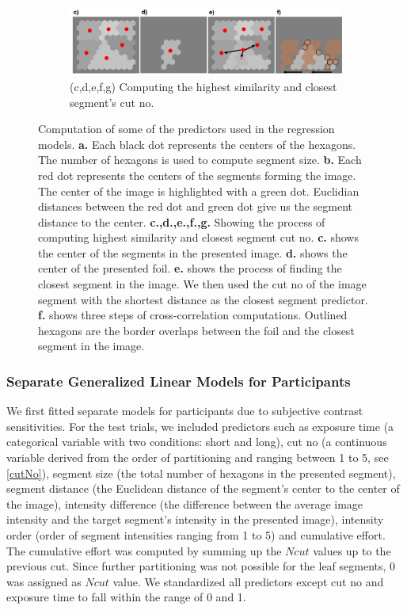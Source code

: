 \documentclass{article}
\begin{document}
\begin{figure}[!ht]
        
    \begin{subfigure}{\textwidth}          
        \centering
        \includegraphics[width = \linewidth]{plots/pred_control.png}
        \caption*{(c,d,e,f,g) Computing the highest similarity and closest segment's cut no.}
        \label{fig:pred_control}    
    \end{subfigure}    
    \label{fig:regressors}
    \caption{Computation of some of the predictors used in the regression models. \textbf{a.} Each black dot represents the centers of the hexagons. The number of hexagons is used to compute segment size. \textbf{b.} Each red dot represents the centers of the segments forming the image. The center of the image is highlighted with a green dot. Euclidian distances between the red dot and green dot give us the segment distance to the center. \textbf{c.,d.,e.,f.,g.} Showing the process of computing highest similarity and closest segment cut no. \textbf{c.} shows the center of the segments in the presented image. \textbf{d.} shows the center of the presented foil. \textbf{e.} shows the process of finding the closest segment in the image. We then used the cut no of the image segment with the shortest distance as the closest segment predictor. \textbf{f.} shows three steps of cross-correlation computations. Outlined hexagons are the border overlaps between the foil and the closest segment in the image.}
\end{figure}

\subsubsection{Separate Generalized Linear Models for Participants}
We first fitted separate models for participants due to subjective contrast sensitivities. For the test trials, we included predictors such as exposure time (a categorical variable with two conditions: short and long), cut no (a continuous variable derived from the order of partitioning and ranging between 1 to 5, see \ref{cutNo}), segment size (the total number of hexagons in the presented segment), segment distance (the Euclidean distance of the segment's center to the center of the image), intensity difference (the difference between the average image intensity and the target segment's intensity in the presented image), intensity order (order of segment intensities ranging from 1 to 5) and cumulative effort. The cumulative effort was computed by summing up the $Ncut$ values up to the previous cut. Since further partitioning was not possible for the leaf segments, 0 was assigned as $Ncut$ value. We standardized all predictors except cut no and exposure time to fall within the range of 0 and 1.
\end{document}
